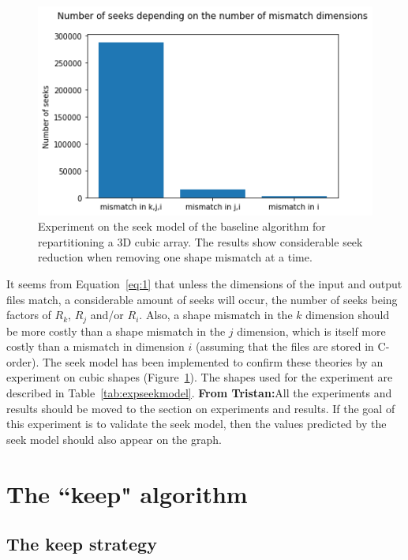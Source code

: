 \documentclass[conference]{IEEEtran}
\newcommand{\tristan}[1]{\color{orange}\textbf{From Tristan:}#1\color{black}}
\begin{document}
\begin{figure}[h]
\centering
\includegraphics[scale=0.55]{./figures/baseline_math_model.png}
\caption{Experiment on the seek model of the baseline algorithm for repartitioning a 3D cubic array.
The results show considerable seek reduction when removing one shape mismatch at a time.
}
\label{fig:baseline_math_model}
\end{figure}

It seems from Equation~\ref{eq:1} that unless the dimensions of the input and
output files match, a considerable amount of seeks will occur, the number of
seeks being factors of $R_k$, $R_j$ and/or $R_i$. Also, a shape mismatch in the
$k$ dimension should be more costly than a shape mismatch in the $j$ dimension,
which is itself more costly than a mismatch in dimension $i$ (assuming that the
files are stored in C-order). The seek model has been implemented to confirm
these theories by an experiment on cubic shapes
(Figure~\ref{fig:baseline_math_model}). The shapes used for the experiment are
described in Table~\ref{tab:expseekmodel}. \tristan{All the experiments and results should be moved to the section on experiments and results.
If the goal of this experiment is to validate the seek model, then the values predicted by the seek model should also appear on the graph.}

\section{The ``keep" algorithm}

\subsection{The keep strategy}
\end{document}
